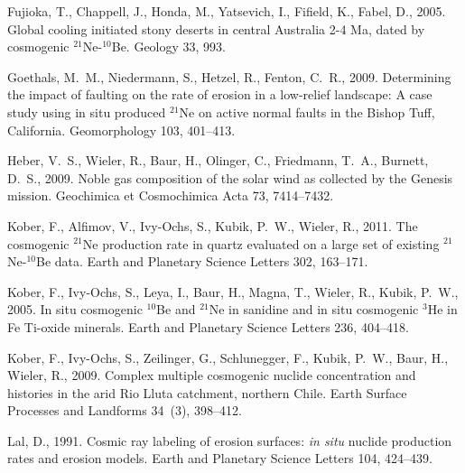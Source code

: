\documentclass[authoryear,review,12pt]{elsarticle}
\begin{document}
\begin{thebibliography}{27}
{Fujioka}, T., {Chappell}, J., {Honda}, M., {Yatsevich}, I., {Fifield}, K.,
  {Fabel}, D., 2005. {Global cooling initiated stony deserts in central
  Australia 2-4 Ma, dated by cosmogenic $^{21}$Ne-$^{10}$Be}. Geology 33, 993.

{Goethals}, M.~M., {Niedermann}, S., {Hetzel}, R., {Fenton}, C.~R., 2009.
  {Determining the impact of faulting on the rate of erosion in a low-relief
  landscape: A case study using in situ produced $^{21}$Ne on active normal
  faults in the Bishop Tuff, California}. Geomorphology 103, 401--413.

{Heber}, V.~S., {Wieler}, R., {Baur}, H., {Olinger}, C., {Friedmann}, T.~A.,
  {Burnett}, D.~S., 2009. {Noble gas composition of the solar wind as collected
  by the Genesis mission}. Geochimica et Cosmochimica Acta 73, 7414--7432.

{Kober}, F., {Alfimov}, V., {Ivy-Ochs}, S., {Kubik}, P.~W., {Wieler}, R., 2011.
  {The cosmogenic $^{21}$Ne production rate in quartz evaluated on a large set
  of existing $^{21}$Ne-$^{10}$Be data}. Earth and Planetary Science Letters
  302, 163--171.

{Kober}, F., {Ivy-Ochs}, S., {Leya}, I., {Baur}, H., {Magna}, T., {Wieler}, R.,
  {Kubik}, P.~W., 2005. {In situ cosmogenic $^{10}$Be and $^{21}$Ne in sanidine
  and in situ cosmogenic $^{3}$He in Fe Ti-oxide minerals}. Earth and Planetary
  Science Letters 236, 404--418.

Kober, F., Ivy-Ochs, S., Zeilinger, G., Schlunegger, F., Kubik, P.~W., Baur,
  H., Wieler, R., 2009. {Complex multiple cosmogenic nuclide concentration and
  histories in the arid Rio Lluta catchment, northern Chile}. Earth Surface
  Processes and Landforms 34~(3), 398--412.

Lal, D., 1991. Cosmic ray labeling of erosion surfaces: {\it in situ} nuclide
  production rates and erosion models. Earth and Planetary Science Letters 104,
  424--439.


\end{thebibliography}
\end{document}
